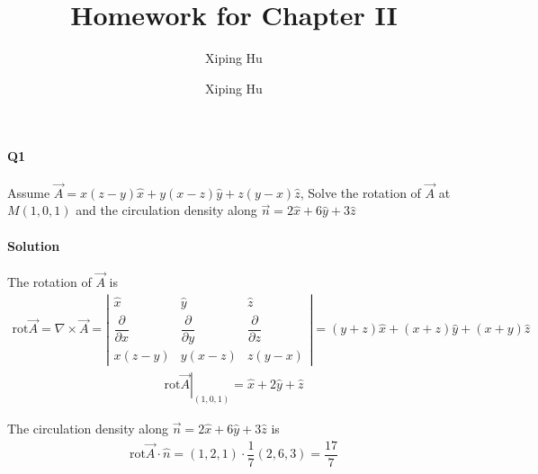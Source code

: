 \documentclass{article}
\author{Xiping Hu}
\author{Xiping Hu}
\affil{http://thehxp.tech/}
\title{Homework for Chapter II}
\begin{document}
\maketitle

\paragraph{Q1}

Assume $\vec{A} = x \left( z-y \right) \hat{x} + y \left( x - z \right) \hat{y} + z \left( y - x \right) \hat{z}$, Solve the rotation of $\vec{A}$ at $M \left( 1,0,1 \right)$ and the circulation density along $\vec{n} = 2 \hat{x} + 6 \hat{y} + 3 \hat{z}$

\paragraph{Solution}

The rotation of $\vec{A}$ is
\begin{equation*}
  \begin{aligned}
    \mathrm{rot} \vec{A} = \nabla \times \vec{A} = \left|
      \begin{array}{ccc}
        \hat{x}& \hat{y} &\hat{z} \\
       \dfrac{\partial}{\partial x}  &  \dfrac{\partial}{\partial y} & \dfrac{\partial}{\partial z} \\
       x \left( z - y \right) & y \left( x - z \right) & z \left( y - x \right)
      \end{array}
    \right| =
    \left( y + z \right) \hat{x} + \left( x + z \right) \hat{y} + \left( x + y \right) \hat{z}
  \end{aligned}
\end{equation*}
\begin{equation*}
  \begin{aligned}
    \left. \mathrm{rot} \vec{A} \right| _{\left( 1,0,1 \right)} = \hat{x} + 2 \hat{y} + \hat{z}
  \end{aligned}
\end{equation*}

The circulation density along $\vec{n} = 2 \hat{x} + 6 \hat{y} + 3 \hat{z}$ is
\begin{equation*}
  \begin{aligned}
    \mathrm{rot} \vec{A} \cdot \hat{n} = \left( 1,2,1 \right) \cdot \dfrac{1}{7} \left( 2,6,3 \right) = \dfrac{17}{7} 
  \end{aligned}
\end{equation*}
\end{document}
